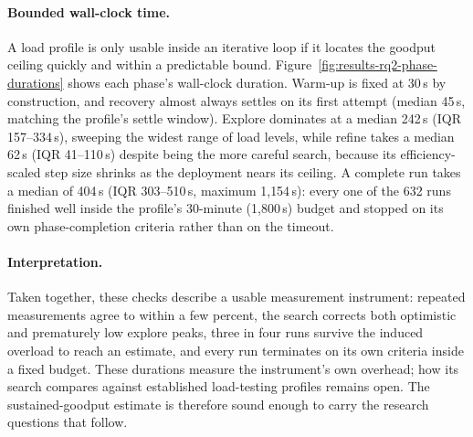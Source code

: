 \paragraph{Bounded wall-clock time.}
A load profile is only usable inside an iterative loop if it locates the
goodput ceiling quickly and within a predictable bound.
Figure~\ref{fig:results-rq2-phase-durations} shows each phase's wall-clock
duration. Warm-up is fixed at 30\,s by construction, and recovery almost always
settles on its first attempt (median 45\,s, matching the profile's settle
window). Explore dominates at a median 242\,s (IQR 157--334\,s), sweeping the
widest range of load levels, while refine takes a median 62\,s (IQR
41--110\,s) despite being the more careful search, because its
efficiency-scaled step size shrinks as the deployment nears its ceiling. A
complete run takes a median of 404\,s (IQR 303--510\,s, maximum 1{,}154\,s):
every one of the 632 runs finished well inside the profile's 30-minute
(1{,}800\,s) budget and stopped on its own phase-completion criteria rather
than on the timeout.

\paragraph{Interpretation.}
Taken together, these checks describe a usable measurement instrument: repeated
measurements agree to within a few percent, the search corrects both optimistic
and prematurely low explore peaks, three in four runs survive the induced
overload to reach an estimate, and every run terminates on its own criteria
inside a fixed budget. These durations measure the instrument's own overhead;
how its search compares against established load-testing profiles remains open.
The sustained-goodput estimate is therefore sound enough to carry the research
questions that follow.
